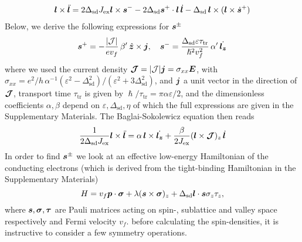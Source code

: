 \begin{multline}
        \boldsymbol{l}\times\ddot{\boldsymbol{l}}=2\Delta_\text{sd}J_\text{ex}\boldsymbol{l}\times\boldsymbol{s}^--2\Delta_\text{sd}\boldsymbol{s}^+\cdot\boldsymbol{l}\,\dot{\boldsymbol{l}}-\Delta_\text{sd}\,\boldsymbol{l}\times(\boldsymbol{l}\times\dot{\boldsymbol{s}}^+)
\end{multline}
Below, we derive the following expressions for $\boldsymbol{s}^\pm$
\begin{equation}
    \boldsymbol{s}^+ = -\frac{|\mathcal{J}|}{ev_f}\,\beta'\,\hat{\boldsymbol{z}}\times\boldsymbol{j}, \quad
    \boldsymbol{s}^- = \frac{\Delta_\text{sd}\varepsilon\tau_\text{tr}}{\hslash^2v_f^2}\,\alpha' \,\dot{\boldsymbol{l_z}}
\end{equation}
where we used the current density $\boldsymbol{\mathcal{J}} = |\mathcal{J}|\boldsymbol{j}=\sigma_{xx}\boldsymbol{E}$, with $\sigma_{xx} = e^2/h\,\alpha^{-1} (\varepsilon^2-\Delta_\text{sd}^2)/(\varepsilon^2+3\Delta_\text{sd}^2)$, and $\boldsymbol{j}$ a unit vector in the direction of $\boldsymbol{\mathcal{J}}$, transport time $\tau_\text{tr}$ is  given by $\hslash/\tau_\text{tr} =\pi\alpha\varepsilon/2$, and the dimensionless coefficients $\alpha,\beta$ depend on $\varepsilon,\Delta_\text{sd},\eta$ of which the full expressions are given in the Supplementary Materials. The Baglai-Sokolewicz equation then reads
\begin{equation}
       \frac{1}{2\Delta_\text{sd}J_\text{ex}}\boldsymbol{l}\times\ddot{\boldsymbol{l}}=
            \alpha\,\boldsymbol{l}\times\dot{\boldsymbol{l_z}}
            +\frac{\beta}{2J_\text{ex}}(\boldsymbol{l}\times\boldsymbol{\mathcal{J}})_z\,\dot{\boldsymbol{l}}
\end{equation}
In order to find $\boldsymbol{s}^\pm$ we look at an effective low-energy Hamiltonian of the conducting electrons (which is derived from the tight-binding Hamiltonian in the Supplementary Materials)
\begin{equation}
H = v_f \boldsymbol{p}\cdot\boldsymbol{\sigma} + \lambda (\boldsymbol{s}\times\boldsymbol{\sigma})_z+\Delta_\text{sd} \boldsymbol{l}\cdot \boldsymbol{s}\sigma_z\tau_z,
\end{equation}
where $\boldsymbol{s},\boldsymbol{\sigma},\boldsymbol{\tau}$ are Pauli matrices acting on spin-, sublattice and valley space respectively and Fermi velocity $v_f$.
before calculating the spin-densities, it is instructive to consider a few symmetry operations.

